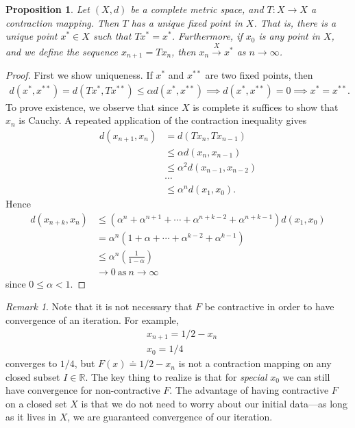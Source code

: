 \documentclass[12pt]{article}
\newcommand{\rr}{\mathbb{R}}
\theoremstyle{plain}
\newtheorem{proposition}[theorem]{Proposition}
\theoremstyle{definition}
\theoremstyle{remark}
\newtheorem*{remark}{Remark}
\numberwithin{equation}{section}  %
\begin{document}
	\begin{proposition}
		\label{lem:fixed-point}
	Let $(X,d)$ be a complete metric space, and $T: X \to X$ a contraction
	mapping. Then $T$ has a unique fixed point in $X$. That is, there is a unique
	point $x^* \in X$ such that $Tx^* = x^*$. Furthermore, if $x_0$ is any point
  in $X$, and we define the sequence $x_{n+1} = Tx_n$, then $x_n \xrightarrow{X} x^*$ as $n
	\to \infty$.
	\end{proposition}
  \begin{proof} First we show uniqueness. If $x^*$ and $x^{**}$ are two fixed
	points, then
	\begin{equation*}
		\begin{split}
			d(x^*, x^{**}) = d(Tx^*, Tx^{**}) \le \alpha d(x^*, x^{**}) \implies d(x^*,
			x^{**}) = 0 \implies x^* = x^{**}.
		\end{split}
	\end{equation*}
To prove existence, we observe that since $X$ is complete it suffices to show
that $x_n$ is Cauchy. A repeated application of the
contraction inequality gives
\begin{equation*}
	\begin{split}
		d\left( x_{n+1},x_n \right)
		& = d\left( Tx_n, Tx_{n-1} \right)
		\\
		& \le \alpha d\left( x_n, x_{n-1} \right)
		\\
		& \le \alpha^2 d\left( x_{n-1}, x_{n-2} \right)
		\\
		& \cdots
		\\
		& \le \alpha^n d\left( x_1, x_0 \right).
	\end{split}
\end{equation*}
Hence
\begin{equation*}
\begin{split}
  d\left( x_{n+k},x_n \right)
  & \le (\alpha^{n } +\alpha^{n+1} + \cdots +
  \alpha^{n+k-2} + \alpha^{n+k-1})d(x_{1}, x_{0}) 
  \\
  & = \alpha^{n}(1 + \alpha + \cdots + \alpha^{k-2} + \alpha^{k-1})
  \\
  & \le \alpha^{n}\left( \frac{1}{1 - \alpha} \right)
  \\
  & \to 0 \ \text{as} \ n \to \infty
\end{split}
\end{equation*}
since $0 \le \alpha < 1$. 
\end{proof}
\begin{remark}
Note that it is not necessary that $F$ be contractive in order to 
have convergence of an iteration. For example,
\begin{align*}
& x_{n+1} = 1/2 - x_n
\\
& x_0 = 1/4
\end{align*}
converges to $1/4$, but $F(x) \doteq 1/2 - x_n$ is not a contraction mapping
on any closed subset $I \in \rr$. The key thing to realize is that
for \emph{special} $x_0$ we can still have convergence for non-contractive $F$.
The advantage of having contractive $F$ on a closed set $X$ is that we do not need to worry
about our initial data---as long as it lives in $X$,
we are guaranteed convergence of our iteration.
\end{remark}
\end{document}

